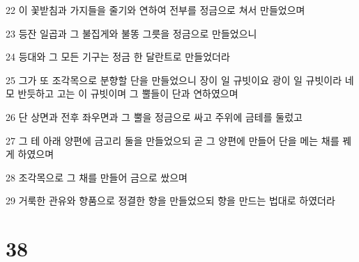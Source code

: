 \par 22 이 꽃받침과 가지들을 줄기와 연하여 전부를 정금으로 쳐서 만들었으며
\par 23 등잔 일곱과 그 불집게와 불똥 그릇을 정금으로 만들었으니
\par 24 등대와 그 모든 기구는 정금 한 달란트로 만들었더라
\par 25 그가 또 조각목으로 분향할 단을 만들었으니 장이 일 규빗이요 광이 일 규빗이라 네모 반듯하고 고는 이 규빗이며 그 뿔들이 단과 연하였으며
\par 26 단 상면과 전후 좌우면과 그 뿔을 정금으로 싸고 주위에 금테를 둘렀고
\par 27 그 테 아래 양편에 금고리 둘을 만들었으되 곧 그 양편에 만들어 단을 메는 채를 꿰게 하였으며
\par 28 조각목으로 그 채를 만들어 금으로 쌌으며
\par 29 거룩한 관유와 향품으로 정결한 향을 만들었으되 향을 만드는 법대로 하였더라

\chapter{38}

